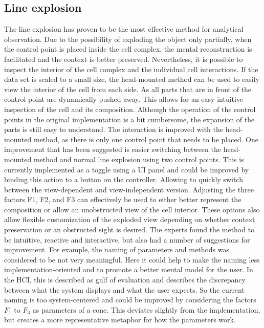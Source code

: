 \subsection{Line explosion}
The line explosion has proven to be the most effective method for analytical observation. Due to the possibility of exploding the object only partially, when the control point is placed inside the cell complex, the mental reconstruction is facilitated and the context is better preserved.
Nevertheless, it is possible to inspect the interior of the cell complex and the individual cell interactions. If the data set is scaled to a small size, the head-mounted method can be used to easily view the interior of the cell from each side. As all parts that are in front of the control point are dynamically pushed away. This allows for an easy intuitive inspection of the cell and its composition. Although the operation of the control points in the original implementation is a bit cumbersome, the expansion of the parts is still easy to understand. The interaction is improved with the head-mounted method, as there is only one control point that needs to be placed. One improvement that has been suggested is easier switching between the head-mounted method and normal line explosion using two control points. 
This is currently implemented as a toggle using a UI panel and could be improved by binding this action to a button on the controller. Allowing to quickly switch between the view-dependent and view-independent version. Adjusting the three factors F1, F2, and F3 can effectively be used to either better represent the composition or allow an unobstructed view of the cell interior. These options also allow flexible customization of the exploded view depending on whether context preservation or an obstructed sight is desired. The experts found the method to be intuitive, reactive and interactive, but also had a number of suggestions for improvement. For example, the naming of parameters and methods was considered to be not very meaningful. Here it could help to make the naming less implementation-oriented and to promote a better mental model for the user. In the HCI, this is described as gulf of evaluation and describes the discrepancy between what the system displays and what the user expects. So the current naming is too system-centered and could be improved by considering the factors $F_1$ to $F_3$ as parameters of a cone. This deviates slightly from the implementation, but creates a more representative metaphor for how the parameters work.
